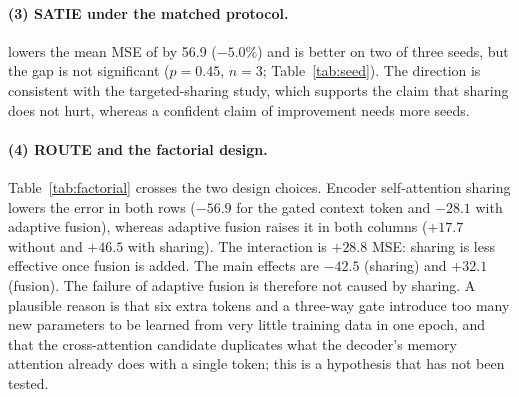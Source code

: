 \paragraph{(3) SATIE under the matched protocol.}
\CAMTNS lowers the mean MSE of \CAMTN by 56.9 ($-5.0\%$) and is better on two of three seeds, but the gap is not significant ($p=0.45$, $n=3$; Table~\ref{tab:seed}). The direction is consistent with the targeted-sharing study, which supports the claim that sharing does not hurt, whereas a confident claim of improvement needs more seeds.

\paragraph{(4) ROUTE and the factorial design.}
Table~\ref{tab:factorial} crosses the two design choices. Encoder self-attention sharing lowers the error in both rows ($-56.9$ for the gated context token and $-28.1$ with adaptive fusion), whereas adaptive fusion raises it in both columns ($+17.7$ without and $+46.5$ with sharing). The interaction is $+28.8$ MSE: sharing is less effective once fusion is added. The main effects are $-42.5$ (sharing) and $+32.1$ (fusion). The failure of adaptive fusion is therefore not caused by sharing. A plausible reason is that six extra tokens and a three-way gate introduce too many new parameters to be learned from very little training data in one epoch, and that the cross-attention candidate duplicates what the decoder's memory attention already does with a single token; this is a hypothesis that has not been tested.

\begin{table}[t]
\centering
\caption{$2{\times}2$ factorial ablation (mean test MSE over three seeds): use of context (gated token or adaptive fusion) $\times$ encoder self-attention sharing.}
\label{tab:factorial}
\scriptsize\resizebox{\columnwidth}{!}{}
\end{table}

